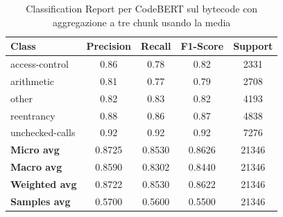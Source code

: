 \documentclass[../../Thesis.tex]{subfiles}
\begin{document}
    \begin{table}[H]
        \centering
        \small
        \begin{tabular}{lcccc}
        \hline
        \textbf{Class} & \textbf{Precision} & \textbf{Recall} & \textbf{F1-Score} & \textbf{Support} \\
        \hline
        access-control & 0.86 & 0.78 & 0.82 & 2331 \\
        arithmetic & 0.81 & 0.77 & 0.79 & 2708 \\
        other & 0.82 & 0.83 & 0.82 & 4193 \\
        reentrancy & 0.88 & 0.86 & 0.87 & 4838 \\
        unchecked-calls & 0.92 & 0.92 & 0.92 & 7276 \\
        \hline
        \textbf{Micro avg} & 0.8725 & 0.8530 & 0.8626 & 21346 \\
        \textbf{Macro avg} & 0.8590 & 0.8302 & 0.8440 & 21346 \\
        \textbf{Weighted avg} & 0.8722 & 0.8530 & 0.8622 & 21346 \\
        \textbf{Samples avg} & 0.5700 & 0.5600 & 0.5500 & 21346 \\
        \hline
        \end{tabular}
        \caption{Classification Report per CodeBERT sul bytecode con aggregazione a tre chunk usando la media}
    \end{table}
        
        
    
\end{document}
